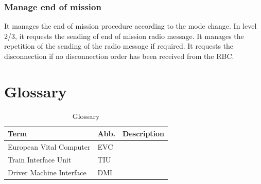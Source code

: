 \documentclass[nocc]{template/openetcs_report}
\begin{document}
\subsection{Manage end of mission}
It manages the end of mission procedure according to the mode change. In level 2/3, it requests the sending of end of mission radio message. 
It manages the repetition of the sending of the radio message if required. 
It requests the disconnection if no disconnection order has been received from the RBC.

\appendix
\chapter{Glossary}
			\begin{longtable}{|l|l|l|}
				\caption{Glossary}\\ 
				\hline
				
					\begin{minipage}[t]{0.40\linewidth} \textbf{Term}	\end{minipage} 
				&	\begin{minipage}[t]{0.20\linewidth} \textbf{Abb.}	\end{minipage} 
				&	\begin{minipage}[t]{0.40\linewidth} \textbf{Description} \end{minipage} \\
				
				\hline
					\begin{minipage}[t]{0.40\linewidth} European Vital Computer	\end{minipage} 
				&	\begin{minipage}[t]{0.20\linewidth} EVC	\end{minipage} 
				&	\begin{minipage}[t]{0.40\linewidth} \end{minipage} \\
				
				\hline
					\begin{minipage}[t]{0.40\linewidth} Train Interface Unit	\end{minipage} 
				&	\begin{minipage}[t]{0.20\linewidth} TIU	\end{minipage} 
				&	\begin{minipage}[t]{0.40\linewidth} \end{minipage} \\
				
				\hline
					\begin{minipage}[t]{0.40\linewidth} Driver Machine Interface	\end{minipage} 
				&	\begin{minipage}[t]{0.20\linewidth} DMI	\end{minipage} 
				&	\begin{minipage}[t]{0.40\linewidth} \end{minipage} \\
				

\end{longtable}
\end{document}
